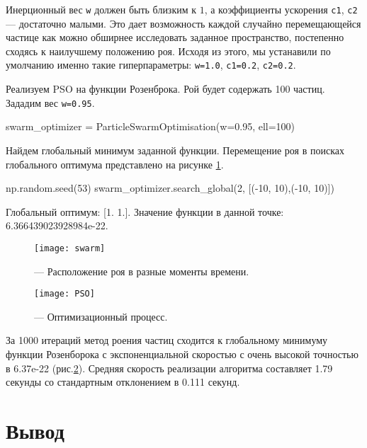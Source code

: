  Инерционный вес \texttt{w} должен быть близким к $1$, а коэффициенты ускорения \texttt{c1}, \texttt{c2} --- достаточно малыми. Это дает возможность каждой случайно перемещающейся частице как можно обширнее исследовать заданное пространство, постепенно сходясь к наилучшему положению роя. Исходя из этого, мы устанавили по умолчанию именно такие гиперпараметры: \texttt{w=1.0}, \texttt{c1=0.2}, \texttt{c2=0.2}.

Реализуем PSO на функции Розенброка. Рой будет содержать 100 частиц. Зададим вес \texttt{w=0.95}.
\begin{pyin}
swarm_optimizer = ParticleSwarmOptimisation(w=0.95, ell=100)
\end{pyin}

Найдем глобальный минимум заданной функции. Перемещение роя в поисках глобального оптимума представлено на рисунке \ref{img:swarm}.
\begin{pyin}
np.random.seed(53)
swarm_optimizer.search_global(2, [(-10, 10),(-10, 10)])
\end{pyin}

\begin{pyout}
Глобальный оптимум: [1. 1.].
Значение функции в данной точке: 6.366439023928984e-22.
\end{pyout}

\begin{figure}[h!]
\centering
\texttt{[image: swarm]}
\caption{ --- Расположение роя в разные моменты времени.}
\label{img:swarm}
\end{figure}

\begin{figure}[h!!]
\centering
\texttt{[image: PSO]}
\caption{ --- Оптимизационный процесс.}
\label{img:PSO}
\end{figure}

За 1000 итераций метод роения частиц сходится к глобальному минимуму функции Розенборока с экспоненциальной скоростью с очень высокой точностью в 6.37e-22 (рис.\ref{img:PSO}). Средняя скорость реализации алгоритма составляет 1.79 секунды со стандартным отклонением в 0.111 секунд.


\section{Вывод}

